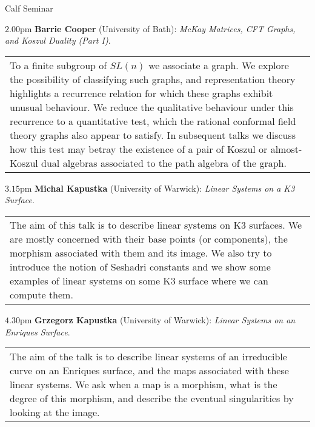 \documentclass{article}
\newcommand{\talk}[4]{\noindent $#1$pm \textbf{#2} (#3): \textit{#4}.}
\newcommand{\startabs}{\begin{center}\begin{tabular}{p{4.2in}}}
\newcommand{\finishabs}{\end{tabular}\end{center}\bigskip}
\begin{document}
\thispagestyle{empty}
\begin{center}
\Large Calf Seminar
\end{center}
\bigskip
 \talk{2.00}{Barrie Cooper}{University of Bath}{McKay Matrices, CFT
Graphs, and Koszul Duality (Part I)}
 \startabs
To a finite subgroup of $SL(n)$ we associate a graph. We explore
the possibility of classifying such graphs, and representation
theory highlights a recurrence relation for which these graphs
exhibit unusual behaviour. We reduce the qualitative behaviour
under this recurrence to a quantitative test, which the rational
conformal field theory graphs also appear to satisfy. In
subsequent talks we discuss how this test may betray the existence
of a pair of Koszul or almost-Koszul dual algebras associated to
the path algebra of the graph.
 \finishabs
 \talk{3.15}{Michal Kapustka}{University of Warwick}{Linear Systems on a K3 Surface}
 \startabs
The aim of this talk is to describe linear systems on K$3$
surfaces. We are mostly concerned with their base points (or
components), the morphism associated with them and its image. We
also try to introduce the notion of Seshadri constants and we show
some examples of linear systems on some K$3$ surface where we can
compute them.
 \finishabs
 \talk{4.30}{Grzegorz Kapustka}{University of Warwick}{Linear Systems on an Enriques Surface}
 \startabs
The aim of the talk is to describe linear systems of an
irreducible curve on an Enriques surface, and the maps associated
with these linear systems. We ask when a map is a morphism, what
is the degree of this morphism, and describe the eventual
singularities by looking at the image.
 \finishabs
\end{document}
